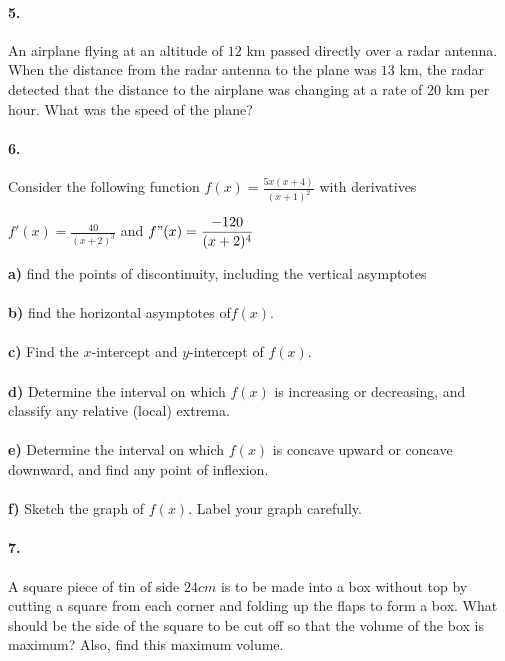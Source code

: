 \documentclass[12pt]{article}
\begin{document}
	\paragraph{5.}
	An airplane flying at an altitude of $12$ km passed directly over a radar antenna. When
	the distance from the radar antenna to the plane was $13$ km, the radar detected that the
	distance to the airplane was changing at a rate of $20$ km per hour. What was the speed of
	the plane?
	
	\paragraph{6.}
	Consider the following function
		$\displaystyle f(x) = \frac{5x(x+4)}{(x+1)^2}$ with derivatives
		\begin{center}
		$\displaystyle f'(x) = \frac{40}{(x+2)^3}$ \hspace{16pt} and \hspace{16pt} $\displaystyle f"(x) = \frac{-120}{(x+2)^4}$\\
		\end{center}
		
	\textbf{a)} find the points of discontinuity, including the  vertical asymptotes\\
	\\
	\textbf{b)} find the horizontal asymptotes of$ \displaystyle f(x).$\\
	\\
	\textbf{c)} Find the $x$-intercept and $y$-intercept of $f(x)$.\\
	\\
	\textbf{d)} Determine the interval on which $f(x)$ is increasing or decreasing, and classify any relative (local) extrema.\\
	\\
	\textbf{e)} Determine the interval on which $f(x)$ is concave upward or concave downward, and find any point of inflexion.\\
	\\
	\textbf{f)} Sketch the graph of $f(x)$. Label your graph carefully.
	
	\paragraph{7.}
	A square piece of tin of side $24cm$ is to be made into a box without top by cutting a square from each corner and folding up the flaps to form a box. What should be the side of the square to be cut off so that the volume of the box is maximum? Also, find this maximum volume.
\end{document}

